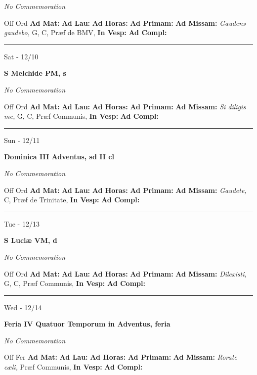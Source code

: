 \documentclass[letterpaper, 10pt]{article}
\begin{document}
\textit{No Commemoration}\begin{justify}
Off Ord
\textbf{Ad Mat: }
\textbf{Ad Lau: }
\textbf{Ad Horas: }
\textbf{Ad Primam: }
\textbf{Ad Missam:} \textit{Gaudens gaudebo, } G, C, Præf de BMV, 
\textbf{In Vesp: }
\textbf{Ad Compl: }\end{justify}



\hrule
\begin{center}
Sat - 12/10
\end{center}\textbf{ \large S Melchide PM, \textnormal{\normalsize s}}

\textit{No Commemoration}\begin{justify}
Off Ord
\textbf{Ad Mat: }
\textbf{Ad Lau: }
\textbf{Ad Horas: }
\textbf{Ad Primam: }
\textbf{Ad Missam:} \textit{Si diligis me, } G, C, Præf Communis, 
\textbf{In Vesp: }
\textbf{Ad Compl: }\end{justify}



\hrule
\begin{center}
Sun - 12/11
\end{center}\textbf{ \large Dominica III Adventus, \textnormal{\normalsize sd II cl}}

\textit{No Commemoration}\begin{justify}
Off Ord
\textbf{Ad Mat: }
\textbf{Ad Lau: }
\textbf{Ad Horas: }
\textbf{Ad Primam: }
\textbf{Ad Missam:} \textit{Gaudete, } C, Præf de Trinitate, 
\textbf{In Vesp: }
\textbf{Ad Compl: }\end{justify}



\hrule
\begin{center}
Tue - 12/13
\end{center}\textbf{ \large S Luciæ VM, \textnormal{\normalsize d}}

\textit{No Commemoration}\begin{justify}
Off Ord
\textbf{Ad Mat: }
\textbf{Ad Lau: }
\textbf{Ad Horas: }
\textbf{Ad Primam: }
\textbf{Ad Missam:} \textit{Dilexisti, } G, C, Præf Communis, 
\textbf{In Vesp: }
\textbf{Ad Compl: }\end{justify}



\hrule
\begin{center}
Wed - 12/14
\end{center}\textbf{ \large Feria IV Quatuor Temporum in Adventus, \textnormal{\normalsize feria}}

\textit{No Commemoration}\begin{justify}
Off Fer
\textbf{Ad Mat: }
\textbf{Ad Lau: }
\textbf{Ad Horas: }
\textbf{Ad Primam: }
\textbf{Ad Missam:} \textit{Rorate cæli, } Præf Communis, 
\textbf{In Vesp: }
\textbf{Ad Compl: }\end{justify}
\end{document}
